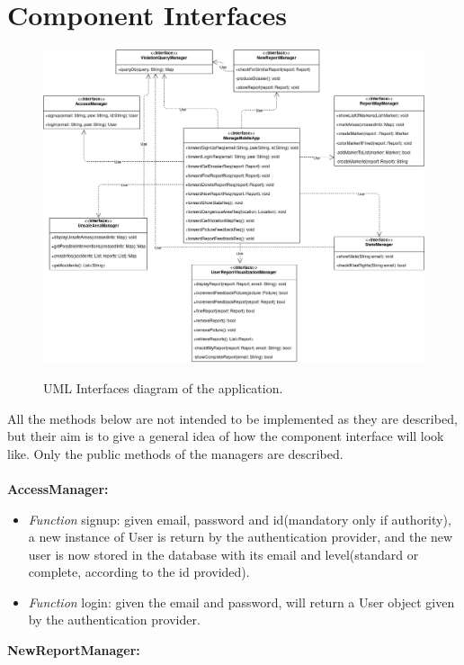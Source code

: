 \documentclass[../RASD.tex]{subfiles}
\begin{document}
    \section{Component Interfaces}\label{sec:component-interfaces}
    \begin{figure}[H]
        \centering
        \includegraphics[scale = 0.45]{assets/interfaces.png}\\[1.6 cm]
        \caption[\textit{UML Interfaces} Diagram]{UML Interfaces diagram of the application.}
    \end{figure}
    All the methods below are not intended to be implemented as they are described, but their aim is to give a general idea of how the component
    interface will look like.
    Only the public methods of the managers are described.
    \\
    \\
    \textbf{AccessManager:}
    \begin{itemize}
        \item \textit{Function} signup: given email, password and id(mandatory only if authority), a new instance of User is return by the authentication provider,
        and the new user is now stored in the database with its email and level(standard or complete, according to the id provided).
        \item \textit{Function} login: given the email and password, will return a User object given by the authentication provider.
    \end{itemize}
    \textbf{NewReportManager:}
\end{document}
